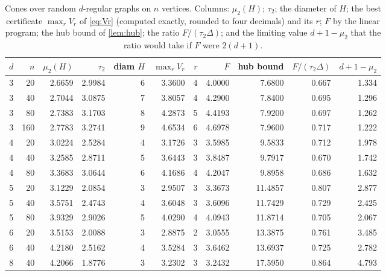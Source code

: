 \documentclass[11pt]{amsart}
\theoremstyle{definition}
\begin{document}
\begin{table}[ht]
\centering
\small
\setlength{\tabcolsep}{4.5pt}
\caption{Cones over random $d$-regular graphs on $n$ vertices. Columns: $\mu_2(H)$; $\tau_2$; the diameter of $H$; the best certificate $\max_rV_r$ of \eqref{eq:Vr} (computed exactly, rounded to four decimals) and its $r$; $F$ by the linear program; the hub bound of \cref{lem:hub}; the ratio $F/(\tau_2\Delta)$; and the limiting value $d+1-\mu_2$ that the ratio would take if $F$ were $2(d+1)$.}\label{tab:rr}
\begin{tabular}{rrrrrrrrrrr}
\toprule
$d$ & $n$ & $\mu_2(H)$ & $\tau_2$ & diam $H$ & $\max_rV_r$ & $r$ & $F$ & hub bound & $F/(\tau_2\Delta)$ & $d+1-\mu_2$\\
\midrule
3 & 20 & 2.6659 & 2.9984 & 6 & 3.3600 & 4 & 4.0000 & 7.6800 & 0.667 & 1.334\\
3 & 40 & 2.7044 & 3.0875 & 7 & 3.8057 & 4 & 4.2900 & 7.8400 & 0.695 & 1.296\\
3 & 80 & 2.7383 & 3.1703 & 8 & 4.2873 & 5 & 4.4193 & 7.9200 & 0.697 & 1.262\\
3 & 160 & 2.7783 & 3.2741 & 9 & 4.6534 & 6 & 4.6978 & 7.9600 & 0.717 & 1.222\\
4 & 20 & 3.0224 & 2.5284 & 4 & 3.1726 & 3 & 3.5985 & 9.5833 & 0.712 & 1.978\\
4 & 40 & 3.2585 & 2.8711 & 5 & 3.6443 & 3 & 3.8487 & 9.7917 & 0.670 & 1.742\\
4 & 80 & 3.3683 & 3.0644 & 6 & 4.1686 & 4 & 4.2047 & 9.8958 & 0.686 & 1.632\\
5 & 20 & 3.1229 & 2.0854 & 3 & 2.9507 & 3 & 3.3673 & 11.4857 & 0.807 & 2.877\\
5 & 40 & 3.5751 & 2.4743 & 4 & 3.6048 & 3 & 3.6096 & 11.7429 & 0.729 & 2.425\\
5 & 80 & 3.9329 & 2.9026 & 5 & 4.0290 & 4 & 4.0943 & 11.8714 & 0.705 & 2.067\\
6 & 20 & 3.5153 & 2.0088 & 3 & 2.8875 & 2 & 3.0555 & 13.3875 & 0.761 & 3.485\\
6 & 40 & 4.2180 & 2.5162 & 4 & 3.5284 & 3 & 3.6462 & 13.6937 & 0.725 & 2.782\\
8 & 40 & 4.2066 & 1.8776 & 3 & 3.2302 & 3 & 3.2432 & 17.5950 & 0.864 & 4.793\\
\bottomrule
\end{tabular}
\end{table}
\end{document}

